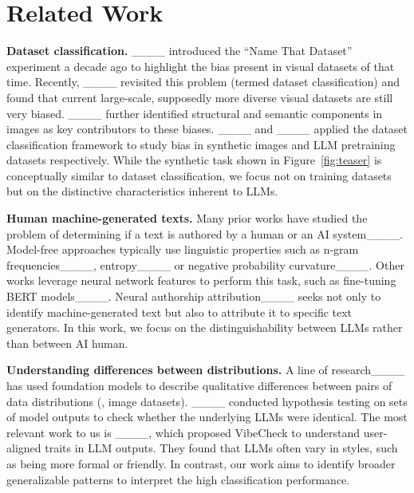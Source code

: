 \section{Related Work}
\textbf{Dataset classification.} ____ introduced the ``Name That Dataset” experiment a decade ago to highlight the bias present in visual datasets of that time. Recently, ____ revisited this problem (termed dataset classification) and found that current large-scale, supposedly more diverse visual datasets are still very biased. ____ further identified structural and semantic components in images as key contributors to these biases. ____ and ____ applied the dataset classification framework to study bias in synthetic images and LLM pretraining datasets respectively. 
While the synthetic task shown in  Figure~\ref{fig:teaser} is conceptually similar to dataset classification, we focus not on training datasets but on the distinctive characteristics inherent to LLMs.








\textbf{Human \vs machine-generated texts.} Many prior works have studied the problem of determining if a text is authored by a human or an AI system____. Model-free approaches typically use linguistic properties such as n-gram frequencies____, entropy____ or negative probability curvature____. Other works leverage neural network features to perform this task, such as fine-tuning BERT models____. Neural authorship attribution____ seeks not only to identify machine-generated text but also to attribute it to specific text generators. In this work, we focus on the distinguishability between LLMs rather than between AI \vs human.

\textbf{Understanding differences between distributions.} A line of research____ has used foundation models to describe qualitative differences between pairs of data distributions (\eg, image datasets). ____ conducted hypothesis testing on sets of model outputs to check whether the underlying LLMs were identical. The most relevant work to us is ____, which proposed VibeCheck to understand user-aligned traits in LLM outputs. They found that LLMs often vary in styles, such as being more formal or friendly. In contrast, our work aims to identify broader generalizable patterns to interpret the high classification performance.